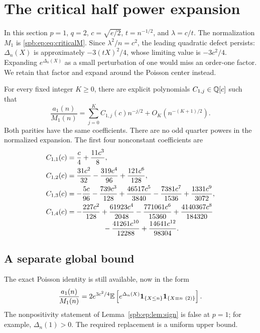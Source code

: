 \section{The critical half power expansion}
\label{spb:ep:sec:critical}
In this section $p=1$, $q=2$, $c=\sqrt{e/2}$,
$t=n^{-1/2}$, and $\lambda=c/t$.
The normalization $M_1$ is \eqref{spb:ep:eq:criticalM}.
Since $\lambda^2/n=c^2$, the leading quadratic defect persists:
$\Delta_n(X)$ is approximately $-3(tX)^2/4$, whose limiting value is
$-3c^2/4$. Expanding $e^{\Delta_n(X)}$ as a small perturbation of one would
miss an order-one factor. We retain that factor and expand around the
Poisson center instead.

\begin{theorem}\label{spb:ep:thm:critical}
For every fixed integer $K\ge0$, there are explicit polynomials
$C_{1,j}\in\mathbb Q[c]$ such that
\begin{equation}\label{spb:ep:eq:criticalall}
 \frac{a_1(n)}{M_1(n)}
     =\sum_{j=0}^K C_{1,j}(c)n^{-j/2}
                    +O_K(n^{-(K+1)/2}).
\end{equation}
Both parities have the same coefficients. There are no odd quarter powers
in the normalized expansion. The first four nonconstant coefficients are
\begin{align}
 C_{1,1}(c)&=\frac c4+\frac{11c^3}{8},\label{spb:ep:eq:critC1}\\
 C_{1,2}(c)&=\frac{31c^2}{32}-\frac{319c^4}{96}
                                      +\frac{121c^6}{128},\label{spb:ep:eq:critC2}\\
 C_{1,3}(c)&=-\frac{5c}{96}-\frac{739c^3}{128}
              +\frac{46517c^5}{3840}-\frac{7381c^7}{1536}
              +\frac{1331c^9}{3072},\label{spb:ep:eq:critC3}\\
 C_{1,4}(c)&=-\frac{227c^2}{128}+\frac{61923c^4}{2048}
              -\frac{771061c^6}{15360}+\frac{4140367c^8}{184320}
              \nonumber\\[-2pt]
          &\hspace{18mm}-\frac{41261c^{10}}{12288}
                         +\frac{14641c^{12}}{98304}.\label{spb:ep:eq:critC4}
\end{align}
\end{theorem}

\subsection{A separate global bound}
The exact Poisson identity is still available, now in the form
\begin{equation}\label{spb:ep:eq:criticalexact}
 \frac{a_1(n)}{M_1(n)}
  =2e^{3c^2/4}\mathbb E\left[e^{\Delta_n(X)}\mathbf 1_{\{X\le n\}}
                               \mathbf 1_{\{X\equiv n\ (2)\}}\right].
\end{equation}
The nonpositivity statement of Lemma~\ref{spb:ep:lem:sign} is false at $p=1$;
for example, $\Delta_n(1)>0$.
The required replacement is a uniform upper bound.

